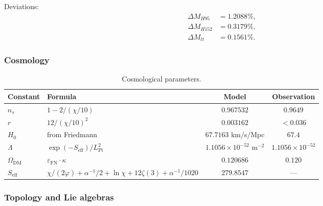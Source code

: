 \documentclass[11pt,a4paper]{article}
\theoremstyle{definition}
\begin{document}
\medskip\noindent
Deviations:
\begin{align}
    \Delta M_{H95} &= 1.2088\%, \\
    \Delta M_{H152} &= 0.3179\%, \\
    \Delta M_{tt} &= 0.1561\%.
\end{align}

\subsubsection{Cosmology}

\begin{table}[ht]
\centering
\caption{Cosmological parameters.}
\label{tab:app-cosmology}
\begin{tabular}{llcc}
\toprule
Constant & Formula & Model & Observation \\
\midrule
$n_s$ & $1 - 2/(\chi/10)$ & $0.967532$ & $0.9649$ \\
$r$ & $12/(\chi/10)^2$ & $0.003162$ & $< 0.036$ \\
$H_0$ & from Friedmann & $67.7163$ km/s/Mpc & $67.4$ \\
$\Lambda$ & $\exp(-S_{\text{eff}})/L_{\text{Pl}}^2$ & $1.1056 \times 10^{-52}$ m$^{-2}$ & $1.1056 \times 10^{-52}$ \\
$\Omega_{\text{DM}}$ & $\varepsilon_{\text{FN}} \cdot \kappa$ & $0.120686$ & $0.120$ \\
$S_{\text{eff}}$ & $\chi/(2\varphi) + \alpha^{-1}/2 + \ln\chi + 12\zeta(3) + \alpha^{-1}/1020$ & $279.8547$ & — \\
\bottomrule
\end{tabular}
\end{table}

\subsubsection{Topology and Lie algebras}
\end{document}

